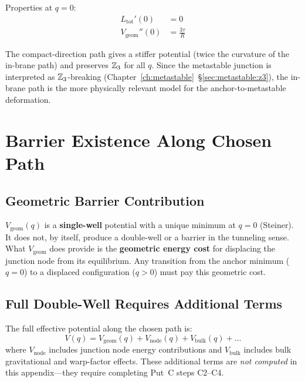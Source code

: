 Properties at $q = 0$:
\begin{align}
    L_{\mathrm{tot}}'(0) &= 0 \\
    V_{\mathrm{geom}}''(0) &= \frac{3\tau}{R}
\end{align}

The compact-direction path gives a stiffer potential (twice the curvature of
the in-brane path) and preserves $\mathbb{Z}_3$ for all $q$. Since the metastable
junction is interpreted as $\mathbb{Z}_3$-breaking
(Chapter~\ref{ch:metastable}~\S\ref{sec:metastable:z3}), the in-brane
path is the more physically relevant model for the anchor-to-metastable
deformation.

\section{Barrier Existence Along Chosen Path}
\label{sec:vq:barrier}

\subsection{Geometric Barrier Contribution}

$V_{\mathrm{geom}}(q)$ is a \textbf{single-well} potential with a unique
minimum at $q = 0$ (Steiner). It does not, by itself, produce a double-well
or a barrier in the tunneling sense. What $V_{\mathrm{geom}}$ does provide
is the \textbf{geometric energy cost} for displacing the junction node from
its equilibrium. Any transition from the anchor minimum ($q = 0$) to a
displaced configuration ($q > 0$) must pay this geometric cost.

\subsection{Full Double-Well Requires Additional Terms}

The full effective potential along the chosen path is:
\begin{equation}
    V(q) = V_{\mathrm{geom}}(q) + V_{\mathrm{node}}(q) + V_{\mathrm{bulk}}(q) + \ldots
    \label{eq:V_decomposition}
\end{equation}
where $V_{\mathrm{node}}$ includes junction node energy contributions and
$V_{\mathrm{bulk}}$ includes bulk gravitational and warp-factor effects.
These additional terms are \emph{not computed} in this appendix---they
require completing Put~C steps C2--C4.

